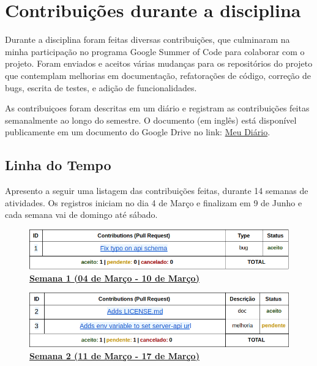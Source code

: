 \chapter{Contribuições durante a disciplina}

 Durante a disciplina foram feitas diversas contribuições, que
 culminaram na minha participação no programa Google Summer of Code para colaborar
 com o projeto. Foram enviados e aceitos várias mudanças para
 os repositórios do projeto que contemplam melhorias em documentação, refatorações
 de código, correção de bugs, escrita de testes, e adição de funcionalidades.

 As contribuiçoes foram descritas em um diário e registram as contribuições
 feitas semanalmente ao longo do semestre. O documento (em inglês) está disponível publicamente 
 em um documento do Google Drive no link: \href{https://docs.google.com/document/d/1AsMZK2SeN7W3hJHHK9ZjVmWU83nYqf7LO4NSWKndc7w/edit}{Meu Diário}.

\section{Linha do Tempo}
\label{cap:linha-do-tempo}

 Apresento a seguir uma listagem das contribuições feitas, durante 14 semanas de
 atividades. Os registros iniciam no dia 4 de Março e finalizam em 9 de Junho e
 cada semana vai de domingo até sábado.
 
\begin{figure}
  \caption{\textbf{\underline{Semana 1 (04 de Março - 10 de Março)}}}
  \includegraphics[width=\linewidth]{figuras/contribs-1.png}
\end{figure}

\begin{figure}
  \caption{\textbf{\underline{Semana 2 (11 de Março - 17 de Março)}}}
  \includegraphics[width=\linewidth]{figuras/contribs-2.png}
\end{figure}

